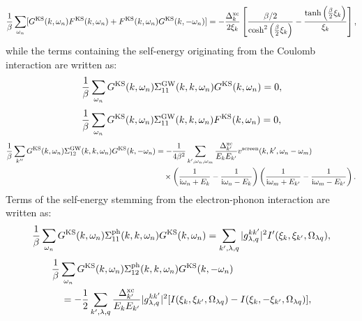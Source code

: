 %
\begin{equation}
	\frac{1}{\beta}\sum_{\omega_n}
	[G^{\rm KS}(k,\omega_n)F^{\rm KS}(k,\omega_n) + F^{\rm KS}(k,\omega_n)G^{\rm KS}(k,-\omega_n)]
	= -\frac{\Delta^{\rm xc}_{k}}{2\xi_{k}} 
	\left[ \frac{\beta/2}{\cosh^2\left( \frac{\beta}{2}\xi_{k} \right)} -
	\frac{\tanh\left( \frac{\beta}{2}\xi_{k} \right)}{\xi_{k}} \right],
	\label{eq:GFFGsum}
\end{equation}
%
while the terms containing the self-energy originating from the Coulomb interaction are written as:
%
\begin{equation}
	\frac{1}{\beta}\sum_{\omega_n} G^{\rm KS}(k,\omega_n)\Sigma^{\rm GW}_{11}(k,k,\omega_n)G^{\rm KS}(k,\omega_n)
	= 0,
	\label{eq:GW11sum1}
\end{equation}
%
\begin{equation}
	\frac{1}{\beta}\sum_{\omega_n} G^{\rm KS}(k,\omega_n)\Sigma^{\rm GW}_{11}(k,k,\omega_n)F^{\rm KS}(k,\omega_n)
	= 0,
	\label{eq:GW11sum2}
\end{equation}
%
\begin{equation}
	\begin{split}
	\frac{1}{\beta}\sum_{k''} G^{\rm KS}(k,\omega_n)\Sigma^{\rm GW}_{12}(k,k,\omega_n)G^{\rm KS}(k,-\omega_n)
	& = -\frac{1}{4\beta^2}\sum_{k',\omega_n,\omega_m}
	\frac{\Delta^{\rm xc}_{k'}}{E_{k}E_{k'}}v^{\rm screen}(k,k',\omega_n - \omega_m) \\
	&\quad \times \left( \frac{1}{ {\rm i}\omega_n + E_{k}} - \frac{1}{ {\rm i}\omega_n - E_{k}} \right)
	\left( \frac{1}{ {\rm i}\omega_m + E_{k'}} - \frac{1}{ {\rm i}\omega_m - E_{k'}} \right).
	\label{eq:GW12sum}
\end{split}
\end{equation}
%
Terms of the self-energy stemming from the electron-phonon interaction are written as:
%
\begin{equation}
	\frac{1}{\beta} \sum_{\omega_n}G^{\rm KS}(k,\omega_n)\Sigma^{\rm ph}_{11}(k,k,\omega_n)G^{\rm KS}(k,\omega_n)
	= \sum_{k',\lambda,q} |g^{kk'}_{\lambda,q}|^2 I'(\xi_k,\xi_{k'},\Omega_{\lambda q}),
	\label{eq:ph11sum1}
\end{equation}
%
\begin{equation}
	\begin{split}
	&\frac{1}{\beta} \sum_{\omega_n}G^{\rm KS}(k,\omega_n)\Sigma^{\rm ph}_{12}(k,k,\omega_n)G^{\rm KS}(k,-\omega_n)\\
	& \quad =
	-\frac{1}{2}\sum_{k',\lambda,q}\frac{\Delta^{\rm xc}_{k'}}{E_{k}E_{k'}}
	|g^{kk'}_{\lambda,q}|^2 [I(\xi_k,\xi_{k'},\Omega_{\lambda q})-I(\xi_k,-\xi_{k'},\Omega_{\lambda q})],
	\end{split}
	\label{eq:ph12sum}
\end{equation}
